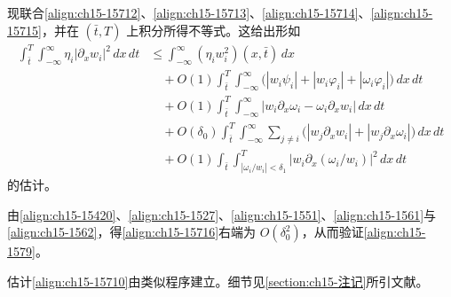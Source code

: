 \documentclass[../../main.tex]{subfiles}
\begin{document}
现联合\eqref{align:ch15-15712}、\eqref{align:ch15-15713}、\eqref{align:ch15-15714}、\eqref{align:ch15-15715}，并在 $(\bar t,T)$ 上积分所得不等式。这给出形如
\begin{align}
\int_{\bar t}^{T}\int_{-\infty}^{\infty}\eta_i|\partial_xw_i|^2\,dx\,dt&\leqslant\int_{-\infty}^{\infty}(\eta_iw_i^2)(x,\bar t)\,dx\nonumber\\
&\quad+O(1)\int_{\bar t}^{T}\int_{-\infty}^{\infty}\bigl(|w_i\psi_i|+|w_i\varphi_i|+|\omega_i\varphi_i|\bigr)\,dx\,dt\nonumber\\
&\quad+O(1)\int_{\bar t}^{T}\int_{-\infty}^{\infty}|w_i\partial_x\omega_i-\omega_i\partial_xw_i|\,dx\,dt\nonumber\\
&\quad+O(\delta_0)\int_{\bar t}^{T}\int_{-\infty}^{\infty}\sum_{j\neq i}\bigl(|w_j\partial_xw_i|+|w_j\partial_x\omega_i|\bigr)\,dx\,dt\nonumber\\
&\quad+O(1)\int_{\bar t}\int_{|\omega_i/w_i|<\delta_1}^{T}|w_i\partial_x(\omega_i/w_i)|^2\,dx\,dt
\label{align:ch15-15716}
\end{align}
的估计。

由\eqref{align:ch15-15420}、\eqref{align:ch15-1527}、\eqref{align:ch15-1551}、\eqref{align:ch15-1561}与\eqref{align:ch15-1562}，得\eqref{align:ch15-15716}右端为 $O(\delta_0^2)$，从而验证\eqref{align:ch15-1579}。

估计\eqref{align:ch15-15710}由类似程序建立。细节见\cref{section:ch15-注记}所引文献。
\end{document}

